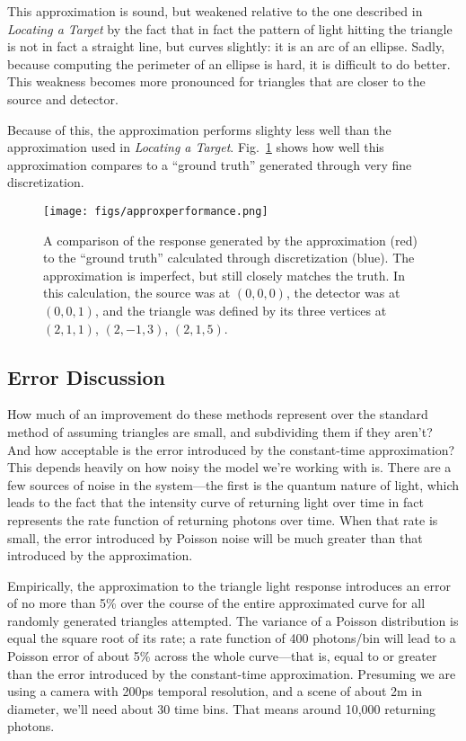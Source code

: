 \documentclass[11pt]{article}
\begin{document}
This approximation is sound, but weakened relative to the one described in \emph{Locating a Target} by the fact that in fact the pattern of light hitting the triangle is not in fact a straight line, but curves slightly: it is an arc of an ellipse. Sadly, because computing the perimeter of an ellipse is hard, it is difficult to do better. This weakness becomes more pronounced for triangles that are closer to the source and detector.

Because of this, the approximation performs slighty less well than the approximation used in \emph{Locating a Target}. Fig.~\ref{fig:approxperformance} shows how well this approximation compares to a ``ground truth'' generated through very fine discretization.

\begin{figure}
\begin{center}
\centering
\texttt{[image: figs/approxperformance.png]}
\caption{A comparison of the response generated by the approximation (red) to the ``ground truth'' calculated through discretization (blue). The approximation is imperfect, but still closely matches the truth. In this calculation, the source was at $(0,0,0)$, the detector was at $(0,0,1)$, and the triangle was defined by its three vertices at $(2,1,1)$, $(2,-1,3)$, $(2,1,5)$. \label{fig:approxperformance}}
\end{center}
\end{figure}

\subsection{Error Discussion}

How much of an improvement do these methods represent over the standard method of assuming triangles are small, and subdividing them if they aren't? And how acceptable is the error introduced by the constant-time approximation? This depends heavily on how noisy the model we're working with is. There are a few sources of noise in the system---the first is the quantum nature of light, which leads to the fact that the intensity curve of returning light over time in fact represents the rate function of returning photons over time. When that rate is small, the error introduced by Poisson noise will be much greater than that introduced by the approximation.

Empirically, the approximation to the triangle light response introduces an error of no more than 5\% over the course of the entire approximated curve for all randomly generated triangles attempted. The variance of a Poisson distribution is equal the square root of its rate; a rate function of 400 photons/bin will lead to a Poisson error of about 5\% across the whole curve---that is, equal to or greater than the error introduced by the constant-time approximation. Presuming we are using a camera with 200ps temporal resolution, and a scene of about 2m in diameter, we'll need about 30 time bins. That means around 10,000 returning photons.
\end{document}

